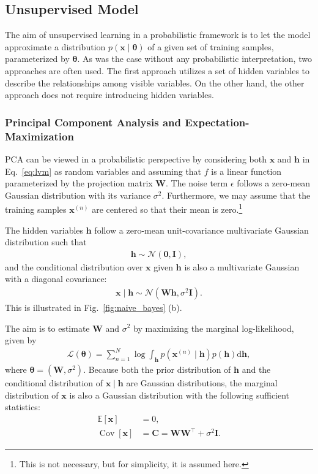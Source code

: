 \documentclass[dissertation,nocontribution]{aaltoseries}
\newcommand{\vect}[1]{\mathbf{#1}}
\newcommand{\vects}[1]{\boldsymbol{#1}}
\newcommand{\matr}[1]{\mathbf{#1}}
\newcommand{\cov}[0]{\operatorname{Cov}}
\newcommand{\vh}[0]{\vect{h}}
\newcommand{\vx}[0]{\vect{x}}
\newcommand{\mW}[0]{\matr{W}}
\newcommand{\mC}{\matr{C}}
\newcommand{\mI}{\matr{I}}
\newcommand{\vzero}[0]{\vects{0}}
\newcommand{\TT}[0]{{\vects{\theta}}}
\newcommand{\NN}[0]{\mathcal{N}}
\newcommand{\LL}[0]{\mathcal{L}}
\newcommand{\E}[0]{\mathbb{E}}
\newcommand{\dd}[1]{\text{d}{#1}}
\begin{document}
\subsection{Unsupervised Model}

The aim of unsupervised learning in a probabilistic
framework is to let the model approximate a distribution
$p(\vx \mid \TT)$ of a given set of training samples,
parameterized by $\TT$. As was the case without any
probabilistic interpretation, two approaches are often used.
The first approach utilizes a set of hidden variables to
describe the relationships among visible variables. On the
other hand, the other approach does not require
introducing hidden variables.

\subsubsection{Principal Component Analysis and
Expectation-Maximization}
\label{sec:ppca}

PCA can be viewed in a probabilistic perspective
\citep[see, e.g.,][]{Tipping1999,Roweis1998} by considering
both $\vx$ and $\vh$ in Eq.~\eqref{eq:lvm} as random
variables and assuming that $f$ is a linear function
parameterized by the projection matrix $\mW$. The noise term
$\epsilon$ follows a zero-mean Gaussian distribution with
its variance $\sigma^2$. Furthermore, we may assume that the
training samples $\vx^{(n)}$ are centered so that their
mean is zero.\footnote{This is not necessary, but for
simplicity, it is assumed here.}

The hidden variables $\vh$ follow a zero-mean
unit-covariance multivariate Gaussian distribution such that
\begin{align*}
    \vh \sim \NN(\vzero, \mI),
\end{align*}
and the conditional distribution over $\vx$ given $\vh$ is
also a multivariate Gaussian with a diagonal covariance:
\begin{align*}
    \vx \mid \vh \sim \NN(\mW \vh, \sigma^2 \mI).
\end{align*}
This is illustrated in Fig.~\ref{fig:naive_bayes} (b).

The aim is to estimate $\mW$ and $\sigma^2$ by maximizing
the marginal log-likelihood, given by
\begin{align}
    \label{eq:ppca_mll}
    \LL(\TT) = \sum_{n=1}^N \log \int_{\vh} p(\vx^{(n)} \mid \vh)
    p(\vh) \dd{\vh},
\end{align}
where $\TT=\left( \mW, \sigma^2 \right)$. Because both the prior
distribution of $\vh$ and the conditional distribution of
$\vx \mid \vh$ are Gaussian distributions, 
the marginal distribution of $\vx$ is also a Gaussian
distribution with the following sufficient statistics:
\begin{align*}
    \E\left[ \vx \right] &= 0,\\
    \cov\left[ \vx \right] &= \mC = \mW \mW^\top + \sigma^2 \mI.
\end{align*}
\end{document}
